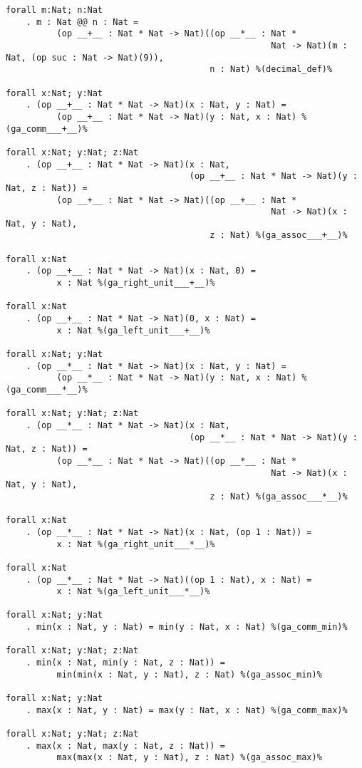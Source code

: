 \documentclass[11pt,a4paper]{article}
\begin{document}
\begin{verbatim}
forall m:Nat; n:Nat
    . m : Nat @@ n : Nat =
          (op __+__ : Nat * Nat -> Nat)((op __*__ : Nat *
                                                    Nat -> Nat)(m : Nat, (op suc : Nat -> Nat)(9)),
                                        n : Nat) %(decimal_def)%

forall x:Nat; y:Nat
    . (op __+__ : Nat * Nat -> Nat)(x : Nat, y : Nat) =
          (op __+__ : Nat * Nat -> Nat)(y : Nat, x : Nat) %(ga_comm___+__)%

forall x:Nat; y:Nat; z:Nat
    . (op __+__ : Nat * Nat -> Nat)(x : Nat,
                                    (op __+__ : Nat * Nat -> Nat)(y : Nat, z : Nat)) =
          (op __+__ : Nat * Nat -> Nat)((op __+__ : Nat *
                                                    Nat -> Nat)(x : Nat, y : Nat),
                                        z : Nat) %(ga_assoc___+__)%

forall x:Nat
    . (op __+__ : Nat * Nat -> Nat)(x : Nat, 0) =
          x : Nat %(ga_right_unit___+__)%

forall x:Nat
    . (op __+__ : Nat * Nat -> Nat)(0, x : Nat) =
          x : Nat %(ga_left_unit___+__)%

forall x:Nat; y:Nat
    . (op __*__ : Nat * Nat -> Nat)(x : Nat, y : Nat) =
          (op __*__ : Nat * Nat -> Nat)(y : Nat, x : Nat) %(ga_comm___*__)%

forall x:Nat; y:Nat; z:Nat
    . (op __*__ : Nat * Nat -> Nat)(x : Nat,
                                    (op __*__ : Nat * Nat -> Nat)(y : Nat, z : Nat)) =
          (op __*__ : Nat * Nat -> Nat)((op __*__ : Nat *
                                                    Nat -> Nat)(x : Nat, y : Nat),
                                        z : Nat) %(ga_assoc___*__)%

forall x:Nat
    . (op __*__ : Nat * Nat -> Nat)(x : Nat, (op 1 : Nat)) =
          x : Nat %(ga_right_unit___*__)%

forall x:Nat
    . (op __*__ : Nat * Nat -> Nat)((op 1 : Nat), x : Nat) =
          x : Nat %(ga_left_unit___*__)%

forall x:Nat; y:Nat
    . min(x : Nat, y : Nat) = min(y : Nat, x : Nat) %(ga_comm_min)%

forall x:Nat; y:Nat; z:Nat
    . min(x : Nat, min(y : Nat, z : Nat)) =
          min(min(x : Nat, y : Nat), z : Nat) %(ga_assoc_min)%

forall x:Nat; y:Nat
    . max(x : Nat, y : Nat) = max(y : Nat, x : Nat) %(ga_comm_max)%

forall x:Nat; y:Nat; z:Nat
    . max(x : Nat, max(y : Nat, z : Nat)) =
          max(max(x : Nat, y : Nat), z : Nat) %(ga_assoc_max)%


\end{verbatim}
\end{document}
